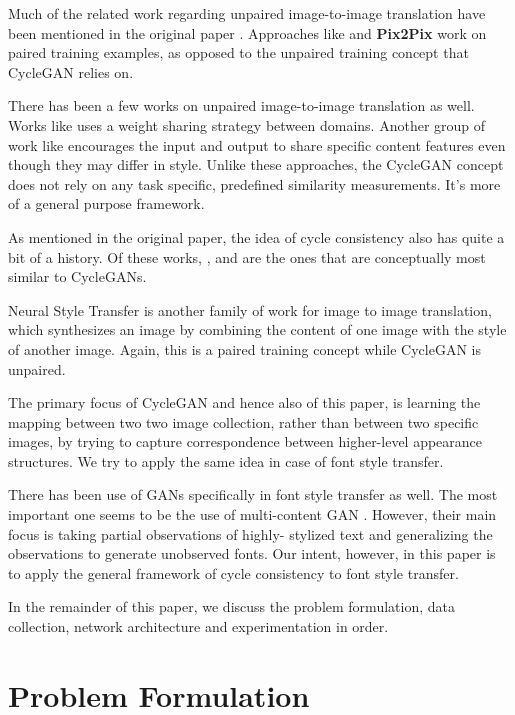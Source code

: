 \documentclass[10pt,twocolumn,letterpaper]{article}
\begin{document}
Much of the related work regarding unpaired image-to-image translation have been mentioned in the 
original paper \cite{cyclegan}. Approaches like \cite{rel3, rel6, rel11, rel12} and \textbf{Pix2Pix} work on 
paired training examples, as opposed to the unpaired training concept that CycleGAN relies on.

There has been a few works on unpaired image-to-image translation as well. Works like \cite{rel13, rel14, 
rel15} uses a weight sharing strategy between domains. Another group of work like \cite{rel16, rel17, rel18} 
encourages the input and output to share specific content features even though they may differ in style. 
Unlike these approaches, the CycleGAN concept does not rely on any task specific, predefined similarity 
measurements. It's more of a general purpose framework.

As mentioned in the original paper, the idea of cycle consistency also has quite a bit of a history. Of these 
works, \cite{rel19}, \cite{rel20} and \cite{rel21} are the ones that are conceptually most similar to 
CycleGANs.

Neural Style Transfer \cite{rel4, rel22, rel23} is another family of work for image to image translation, 
which synthesizes an image by combining the content of one image with the style of another image. 
Again, this is a paired training concept while CycleGAN is unpaired.

The primary focus of CycleGAN and hence also of this paper, is learning the mapping between two two image collection, rather than between two specific images, by trying to capture correspondence between higher-level appearance structures. We try to apply the same idea in case of font style transfer.

There has been use of GANs specifically in font style transfer as well. The most important one seems to be
the use of multi-content GAN \cite{gan3}. However, their main focus is taking partial observations of highly-
stylized text and generalizing the observations to generate unobserved fonts. Our intent, however, in this paper is to apply the general framework of cycle consistency to font style transfer.

In the remainder of this paper, we discuss the problem formulation, data collection, network architecture
and experimentation in order.

\section{Problem Formulation}
\end{document}

